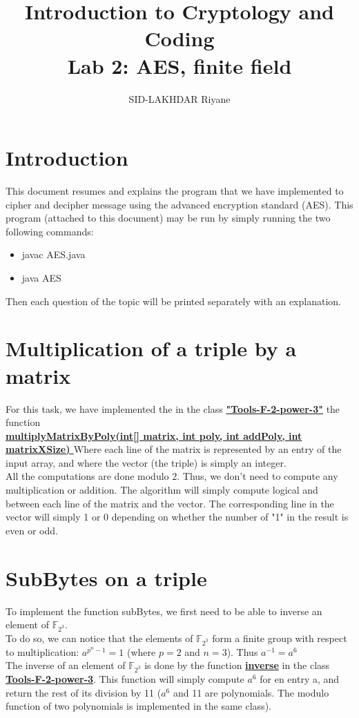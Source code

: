 \documentclass[12pt]{article} %
\begin{document}
\author{SID-LAKHDAR Riyane}
\title{Introduction to Cryptology and Coding\\ Lab 2: AES, finite field}
\maketitle
\tableofcontents
\newpage


\section{Introduction}
This document resumes and explains the program that we have implemented to cipher and decipher message using the advanced encryption standard (AES).   This program (attached to this document) may be run by simply running the two following commands:
\begin{itemize}
	\item javac AES.java
    \item java AES
\end{itemize}
Then each question of the topic will be printed separately with an explanation.


\section{Multiplication of a triple by a matrix}
For this task, we have implemented the in the class \textbf{\underline{	"Tools-F-2-power-3"}} the function\\
	\textbf{\underline{	multiplyMatrixByPoly(int[] matrix, int poly, int addPoly, int matrixXSize)
}}
Where each line of the matrix is represented by an entry of the input array, and where the vector (the triple) is simply an integer.\\
All the computations are done modulo 2.  Thus, we don't need to compute any multiplication or addition.   The algorithm will simply compute logical and between each line of the matrix and the vector.   The corresponding line in the vector will simply 1 or 0 depending on whether the number of "1" in the result is even or odd.



\section{SubBytes on a triple}
To implement the function subBytes, we first need to be able to inverse an element of $\mathbb{F}_{2^3}$.\\
To do so, we can notice that the elements of $\mathbb{F}_{2^3}$ form a finite group with respect to multiplication: $a^{p^{n} - 1} = 1$ (where $p = 2$ and $n = 3$).   Thus $a^{-1} = a^{6} $\\
The inverse of an element of $\mathbb{F}_{2^3}$ is done by the function \textbf{\underline{inverse}} in the class \textbf{\underline{Tools-F-2-power-3}}.   This function will simply compute $a^6$ for en entry a, and return the rest of its division by 11 ($a^6$ and 11 are polynomials.  The modulo function of two polynomials is implemented in the same class).\\
\end{document}
